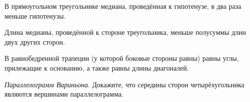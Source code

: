 \documentclass{article}
\begin{document}
    \begin{enumerate_boxed}

        \item В прямоугольном треугольнике медиана, проведённая к гипотенузе, в два раза меньше гипотенузы.

        \item Длина медианы, проведённой к стороне треугольника, меньше полусуммы длин двух других сторон.

        \item В равнобедренной трапеции (у которой боковые стороны равны) равны углы, прилежащие к основанию, а также равны длины диагоналей.

        \item \textit{Параллелограмм Вариньона}.
        Докажите, что середины сторон четырёхугольника являются вершинами параллелограмма.

    \end{enumerate_boxed}
\end{document}
